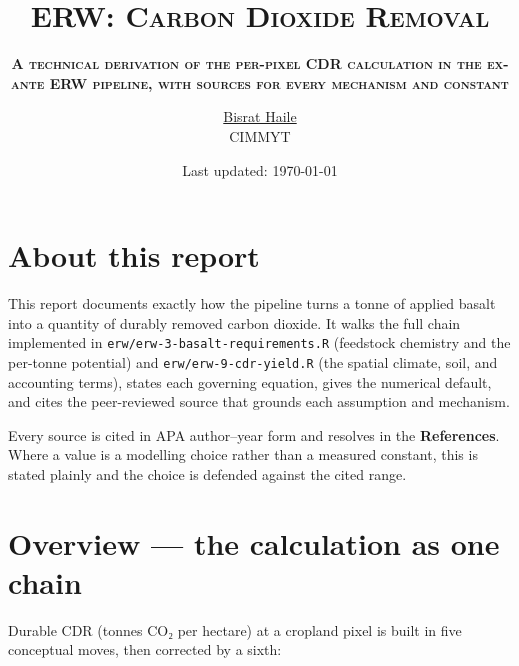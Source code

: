 \documentclass[openany]{book}
\title{\huge{\textbf{ERW:}} \textsc{Carbon Dioxide Removal}}
\subtitle{\textsc{\large \textbf{A technical derivation of the per-pixel CDR
calculation in the ex-ante ERW pipeline, with sources for every mechanism and
constant}}}
\author{\href{mailto:bismignot@gmail.com}{Bisrat Haile}\\CIMMYT}
\date{Last updated: \today}
\begin{document}
\frontmatter
\maketitle
\tableofcontents
\newpage
\listoftables
\mainmatter

\chapter*{About this report}

This report documents exactly how the pipeline turns a tonne of applied basalt
into a quantity of durably removed carbon dioxide. It walks the full chain
implemented in \texttt{erw/erw-3-basalt-requirements.R} (feedstock chemistry
and the per-tonne potential) and \texttt{erw/erw-9-cdr-yield.R} (the spatial
climate, soil, and accounting terms), states each governing equation, gives the
numerical default, and cites the peer-reviewed source that grounds each
assumption and mechanism.

Every source is cited in APA author--year form and resolves in the
\textbf{References}. Where a value is a modelling choice rather than a measured
constant, this is stated plainly and the choice is defended against the cited
range.


\chapter{Overview --- the calculation as one chain}\label{ch:overview}

Durable CDR (tonnes CO₂ per hectare) at a cropland pixel is built in five
conceptual moves, then corrected by a sixth:
\end{document}
